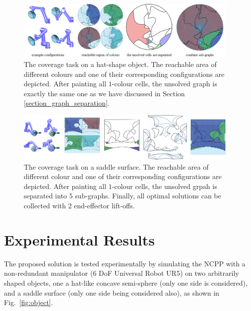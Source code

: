 \documentclass[journal]{IEEEtran}
\begin{document}
\begin{figure}[t]
\centering
\includegraphics[width=0.96\textwidth]{figures/hat_exp/fig_hat_2}
\caption{The coverage task on a hat-shape object. The reachable area of different colours and one of their corresponding configurations are depicted. After painting all $1$-colour cells, the unsolved graph is exactly the same one as we have discussed in Section \ref{section_graph_separation}. }\label{fig:hat}
\end{figure}
\begin{figure}[t]
\centering
\includegraphics[width=0.96\textwidth]{figures/saddle_exp/comb}
\caption{The coverage task on a saddle surface. The reachable area of different colour and one of their corresponding configurations are depicted. After painting all $1$-colour cells, the unsolved grpah is separated into $5$ sub-graphs. Finally, all optimal solutions can be collected with 2 end-effector lift-offs.    }
\label{fig:saddle}
\end{figure}

\section{Experimental Results}\label{section_experiment}
\label{section_results}

The proposed solution is tested experimentally by simulating the NCPP with a non-redundant manipulator (6 DoF Universal Robot UR5) on two arbitrarily shaped objects, one a hat-like concave semi-sphere (only one side is considered), and a saddle surface (only one side being considered also), as shown in Fig.~\ref{fig:object}.
\end{document}
